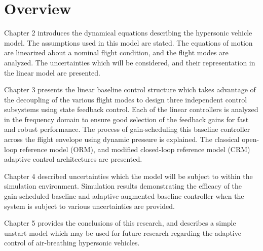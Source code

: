 \section{Overview}

Chapter 2 introduces the dynamical equations describing the hypersonic vehicle model.
The assumptions used in this model are stated.
The equations of motion are linearized about a nominal flight condition, and the flight modes are analyzed.
The uncertainties which will be considered, and their representation in the linear model are presented.

Chapter 3 presents the linear baseline control structure which takes advantage of the decoupling of the various flight modes to design three independent control subsystems using state feedback control.
Each of the linear controllers is analyzed in the frequency domain to ensure good selection of the feedback gains for fast and robust performance.
The process of gain-scheduling this baseline controller across the flight envelope using dynamic pressure is explained.
The classical open-loop reference model (ORM), and modified closed-loop reference model (CRM) adaptive control architectures are presented.

Chapter 4 described uncertainties which the model will be subject to within the simulation environment.
Simulation results demonstrating the efficacy of the gain-scheduled baseline and adaptive-augmented baseline controller when the system is subject to various uncertainties are provided.

Chapter 5 provides the conclusions of this research, and describes a simple unstart model which may be used for future research regarding the adaptive control of air-breathing hypersonic vehicles.
